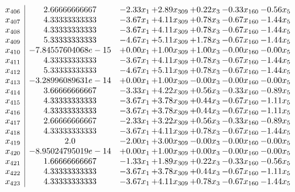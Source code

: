 \documentclass[8pt]{article}
\begin{document}
\[\begin{array}{c| c c@{\hskip 2pt} c@{\hskip 2pt} c@{\hskip 2pt} c@{\hskip 2pt} c@{\hskip 2pt} }
 x_{406}   &  2.66666666667 & -2.33 x_{1} & +  2.89 x_{309} & +  0.22 x_{3} & -0.33 x_{160} & -0.56 x_{5}\\
 x_{407}   &  4.33333333333 & -3.67 x_{1} & +  4.11 x_{309} & +  0.78 x_{3} & -0.67 x_{160} & -1.44 x_{5}\\
 x_{408}   &  4.33333333333 & -3.67 x_{1} & +  4.11 x_{309} & +  0.78 x_{3} & -0.67 x_{160} & -1.44 x_{5}\\
 x_{409}   &  5.33333333333 & -4.67 x_{1} & +  5.11 x_{309} & +  1.78 x_{3} & -0.67 x_{160} & -1.44 x_{5}\\
 x_{410}   &  -7.84557604068e-15 & +  0.00 x_{1} & +  1.00 x_{309} & +  1.00 x_{3} & -0.00 x_{160} & -0.00 x_{5}\\
 x_{411}   &  4.33333333333 & -3.67 x_{1} & +  4.11 x_{309} & +  0.78 x_{3} & -0.67 x_{160} & -1.44 x_{5}\\
 x_{412}   &  5.33333333333 & -4.67 x_{1} & +  5.11 x_{309} & +  0.78 x_{3} & -0.67 x_{160} & -1.44 x_{5}\\
 x_{413}   &  -3.28996089631e-14 & +  0.00 x_{1} & +  1.00 x_{309} & -0.00 x_{3} & -0.00 x_{160} & -0.00 x_{5}\\
 x_{414}   &  3.66666666667 & -3.33 x_{1} & +  4.22 x_{309} & +  0.56 x_{3} & -0.33 x_{160} & -0.89 x_{5}\\
 x_{415}   &  4.33333333333 & -3.67 x_{1} & +  3.78 x_{309} & +  0.44 x_{3} & -0.67 x_{160} & -1.11 x_{5}\\
 x_{416}   &  4.33333333333 & -3.67 x_{1} & +  3.78 x_{309} & +  0.44 x_{3} & -0.67 x_{160} & -1.11 x_{5}\\
 x_{417}   &  2.66666666667 & -2.33 x_{1} & +  3.22 x_{309} & +  0.56 x_{3} & -0.33 x_{160} & -0.89 x_{5}\\
 x_{418}   &  4.33333333333 & -3.67 x_{1} & +  4.11 x_{309} & +  0.78 x_{3} & -0.67 x_{160} & -1.44 x_{5}\\
 x_{419}   &  2.0 & -2.00 x_{1} & +  3.00 x_{309} & -0.00 x_{3} & -0.00 x_{160} & -0.00 x_{5}\\
 x_{420}   &  -8.95024795019e-14 & +  0.00 x_{1} & +  1.00 x_{309} & +  0.00 x_{3} & -0.00 x_{160} & -0.00 x_{5}\\
 x_{421}   &  1.66666666667 & -1.33 x_{1} & +  1.89 x_{309} & +  0.22 x_{3} & -0.33 x_{160} & -0.56 x_{5}\\
 x_{422}   &  4.33333333333 & -3.67 x_{1} & +  3.78 x_{309} & +  0.44 x_{3} & -0.67 x_{160} & -1.11 x_{5}\\
 x_{423}   &  4.33333333333 & -3.67 x_{1} & +  4.11 x_{309} & +  0.78 x_{3} & -0.67 x_{160} & -1.44 x_{5}\\

\end{array}\]
\end{document}
